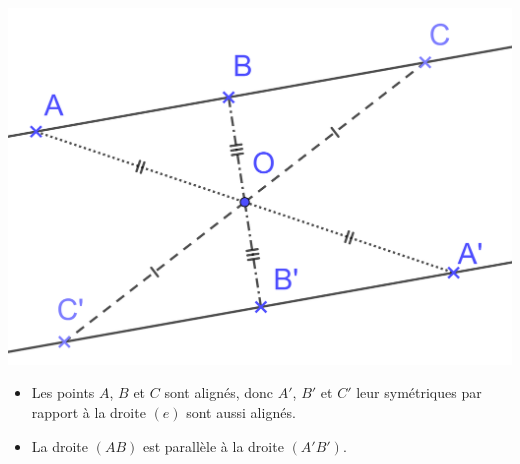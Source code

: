 \documentclass[xcolor={dvipsnames}]{beamer}
\begin{document}
\begin{frame}
\begin{myexs}
\begin{columns}
			\begin{column}{0.5\textwidth}
			\begin{center}
				\includegraphics[scale=0.12]{sym_droites2}\pause
			\end{center}
			
			\begin{itemize}
				\item Les points $A$, $B$ et $C$ sont alignés, donc $A'$, $B'$ et $C'$ leur symétriques par rapport à la droite $(e)$ sont aussi alignés.\pause
				\item La droite $(AB)$ est parallèle à la droite $(A'B')$.
			\end{itemize}
			\end{column}
		\end{columns}
	\end{myexs}
\end{frame}
\end{document}

